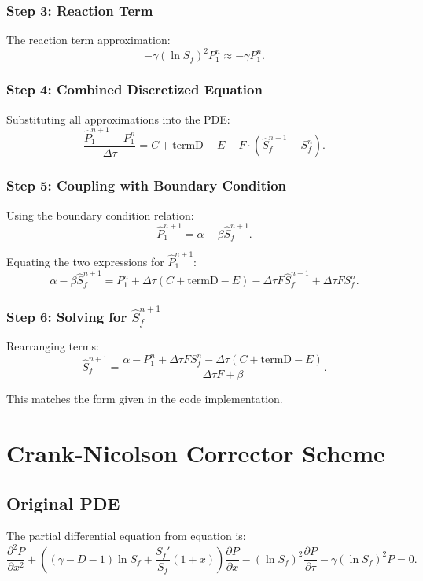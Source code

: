 \documentclass{article}
\begin{document}
\subsubsection{Step 3: Reaction Term}
The reaction term approximation:
\begin{equation}
-\gamma (\ln S_f)^2 P_1^n \approx -\gamma P_1^n.
\end{equation}

\subsubsection{Step 4: Combined Discretized Equation}
Substituting all approximations into the PDE:
\begin{equation}
\frac{\hat{P}_1^{n+1} - P_1^n}{\Delta \tau} = C + \text{termD} - E - F \cdot (\hat{S}_f^{n+1} - S_f^n).
\end{equation}

\subsubsection{Step 5: Coupling with Boundary Condition}
Using the boundary condition relation:
\begin{equation}
\hat{P}_1^{n+1} = \alpha - \beta \hat{S}_f^{n+1}.
\end{equation}

Equating the two expressions for $\hat{P}_1^{n+1}$:
\begin{equation}
\alpha - \beta \hat{S}_f^{n+1} = P_1^n + \Delta \tau (C + \text{termD} - E) - \Delta \tau F \hat{S}_f^{n+1} + \Delta \tau F S_f^n.
\end{equation}

\subsubsection{Step 6: Solving for $\hat{S}_f^{n+1}$}
Rearranging terms:
\begin{equation}
\hat{S}_f^{n+1} = \frac{\alpha - P_1^n + \Delta \tau F S_f^n - \Delta \tau (C + \text{termD} - E)}{\Delta \tau F + \beta}.
\end{equation}

This matches the form given in the code implementation.
\section{Crank-Nicolson Corrector Scheme}

\subsection{Original PDE}
The partial differential equation from equation is:
\begin{equation}
\frac{\partial^2 P}{\partial x^2} + \left( (\gamma - D - 1) \ln S_f + \frac{S_f'}{S_f} (1 + x) \right) \frac{\partial P}{\partial x} - (\ln S_f)^2 \frac{\partial P}{\partial \tau} - \gamma (\ln S_f)^2 P = 0.
\end{equation}
\end{document}
